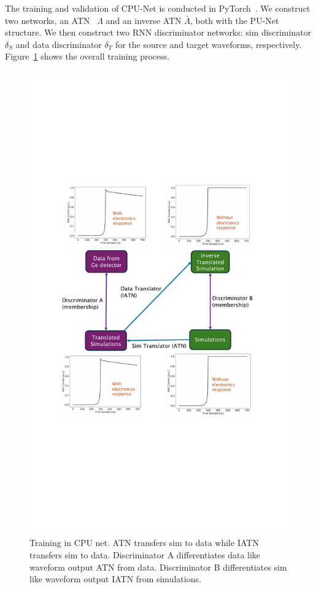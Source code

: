 The training and validation of CPU-Net is conducted in PyTorch~\cite{pytorch}. We construct two networks, an ATN~ $\Lambda$ and an inverse ATN $\bar{\Lambda}$, both with the PU-Net structure. We then construct two RNN discriminator networks: sim discriminator $\delta_{S}$ and data discriminator $\delta_{T}$ for the source and target waveforms, respectively. Figure~\ref{fig:network_training} shows the overall training process.
\clearpage
\begin{figure}[htb!]
    \centering
    \includegraphics[width=0.99\linewidth,trim={5.5pc 20pc 6.3pc 19pc},clip]{ch7/figs/cycle_gan_training.pdf}
    \caption{Training in CPU net. ATN transfers sim to data while IATN transfers sim to data. Discriminator A differentiates data like waveform output ATN from data. Discriminator B differentiates sim like waveform output IATN from simulations.}
   \label{fig:network_training}
\end{figure}


